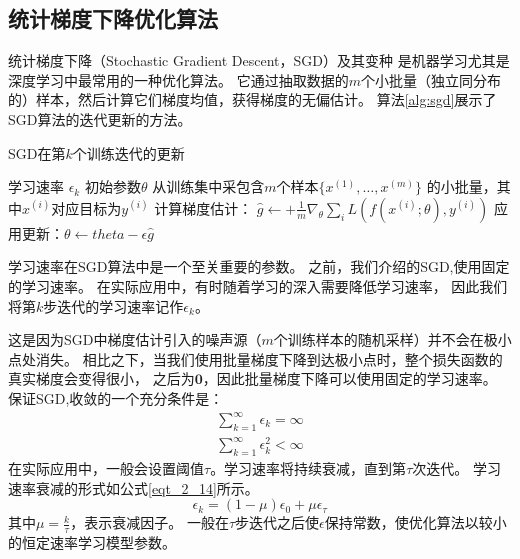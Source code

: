 \subsection{统计梯度下降优化算法}
统计梯度下降（Stochastic Gradient Descent，SGD）及其变种
是机器学习尤其是深度学习中最常用的一种优化算法\cite{bottou2010large}。
它通过抽取数据的$m$个小批量（独立同分布的）样本，然后计算它们梯度均值，获得梯度的无偏估计。
算法\ref{alg:sgd}展示了SGD算法的迭代更新的方法。

\begin{algorithm}[ht]
	\caption{SGD在第$k$个训练迭代的更新}
	\label{alg:sgd}
	\begin{algorithmic}
		\REQUIRE 学习速率 $\epsilon_k$
		\REQUIRE 初始参数$\theta$
		\STATE 从训练集中采包含$m$个样本$\{ x^{(1)},\dots, x^{(m)}\}$ 的小批量，其中$x^{(i)}$对应目标为$y^{(i)}$
		\STATE 计算梯度估计： $\hat{g} \leftarrow + 
		\frac{1}{m} \nabla_{\theta} \sum_i L(f(x^{(i)};\theta),y^{(i)})$
		\STATE 应用更新：$\theta \leftarrow theta - \epsilon \hat{g}$
		\ENDWHILE
	\end{algorithmic}
\end{algorithm}

学习速率在SGD算法中是一个至关重要的参数。
之前，我们介绍的SGD,使用固定的学习速率。
在实际应用中，有时随着学习的深入需要降低学习速率，
因此我们将第$k$步迭代的学习速率记作$\epsilon_k$。

这是因为SGD中梯度估计引入的噪声源（$m$个训练样本的随机采样）并不会在极小点处消失。
相比之下，当我们使用批量梯度下降到达极小点时，整个损失函数的真实梯度会变得很小，
之后为$\mathbf{0}$，因此批量梯度下降可以使用固定的学习速率。
保证SGD,收敛的一个充分条件是：
\begin{equation}
\label{eq:8.12}
	\begin{aligned}
		\sum_{k=1}^\infty \epsilon_k = \infty\\
		\sum_{k=1}^\infty \epsilon_k^2 < \infty
	\end{aligned}
\end{equation}
在实际应用中，一般会设置阈值$\tau$。学习速率将持续衰减，直到第$\tau$次迭代。
学习速率衰减的形式如公式\eqref{eqt_2_14}所示。
\begin{equation}
\label{eqt_2_14}
\epsilon_k = (1-\mu) \epsilon_0 + \mu \epsilon_\tau
\end{equation}
其中$\mu = \frac{k}{\tau}$，表示衰减因子。
一般在$\tau$步迭代之后使$\epsilon$保持常数，使优化算法以较小的恒定速率学习模型参数。

